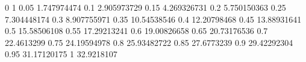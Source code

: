 0	1
0.05	1.747974474
0.1	2.905973729
0.15	4.269326731
0.2	5.750150363
0.25	7.304448174
0.3	8.907755971
0.35	10.54538546
0.4	12.20798468
0.45	13.88931641
0.5	15.58506108
0.55	17.29213241
0.6	19.00826658
0.65	20.73176536
0.7	22.4613299
0.75	24.19594978
0.8	25.93482722
0.85	27.6773239
0.9	29.42292304
0.95	31.17120175
1	32.9218107

